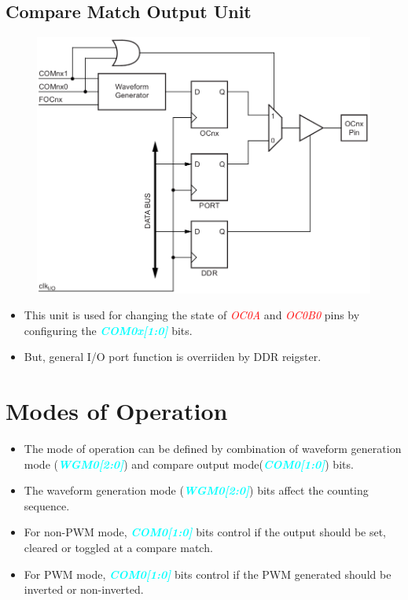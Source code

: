 \documentclass{article}
\newcommand{\bitFormat}[1]{\emph{\textbf{\textcolor{cyan}{#1}}}}
\newcommand{\pinFormat}[1]{\emph{\textcolor{red}{#1}}}
\begin{document}
\subsection{Compare Match Output Unit}
\begin{figure}[H]
    \begin{center}
        \includegraphics[height=0.3\textheight]{Timer0ComparteMatch.png}
    \end{center}
\end{figure}
\begin{itemize}
    \item This unit is used for changing the state of \pinFormat{OC0A} and \pinFormat{OC0B0} pins by configuring the \bitFormat{COM0x[1:0]} bits.
    \item But, general I/O port function is overriiden by DDR reigster.
\end{itemize}

\section{Modes of Operation}
\begin{itemize}
    \item The mode of operation can be defined by combination of waveform generation mode (\bitFormat{WGM0[2:0]}) and compare output mode(\bitFormat{COM0[1:0]}) bits.
    \item The waveform generation mode (\bitFormat{WGM0[2:0]}) bits affect the counting sequence.
    \item For non-PWM mode, \bitFormat{COM0[1:0]} bits control if the output should be set, cleared or toggled at a compare match.
    \item For PWM mode, \bitFormat{COM0[1:0]} bits control if the PWM generated should be inverted or non-inverted.
\end{itemize}
\end{document}
